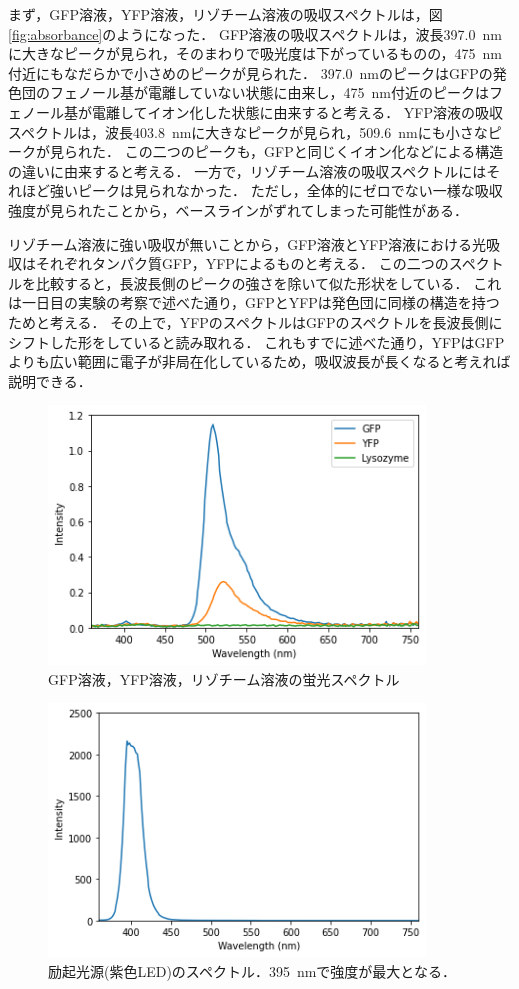 \documentclass[a4paper,11pt, titlepage]{jsarticle}
\begin{document}
まず，GFP溶液，YFP溶液，リゾチーム溶液の吸収スペクトルは，図\ref{fig:absorbance}のようになった．
GFP溶液の吸収スペクトルは，波長\SI{397.0}{\nm}に大きなピークが見られ，そのまわりで吸光度は下がっているものの，\SI{475}{\nm}付近にもなだらかで小さめのピークが見られた．
\SI{397.0}{\nm}のピークはGFPの発色団のフェノール基が電離していない状態に由来し，\SI{475}{\nm}付近のピークはフェノール基が電離してイオン化した状態に由来すると考える．
YFP溶液の吸収スペクトルは，波長\SI{403.8}{\nm}に大きなピークが見られ，\SI{509.6}{\nm}にも小さなピークが見られた．
この二つのピークも，GFPと同じくイオン化などによる構造の違いに由来すると考える．
一方で，リゾチーム溶液の吸収スペクトルにはそれほど強いピークは見られなかった．
ただし，全体的にゼロでない一様な吸収強度が見られたことから，ベースラインがずれてしまった可能性がある．

リゾチーム溶液に強い吸収が無いことから，GFP溶液とYFP溶液における光吸収はそれぞれタンパク質GFP，YFPによるものと考える．
この二つのスペクトルを比較すると，長波長側のピークの強さを除いて似た形状をしている．
これは一日目の実験の考察で述べた通り，GFPとYFPは発色団に同様の構造を持つためと考える．
その上で，YFPのスペクトルはGFPのスペクトルを長波長側にシフトした形をしていると読み取れる．
これもすでに述べた通り，YFPはGFPよりも広い範囲に電子が非局在化しているため，吸収波長が長くなると考えれば説明できる．

\begin{figure}[htbp]
    \centering
    \includegraphics[width=10cm]{fluorescent.png}
    \caption{GFP溶液，YFP溶液，リゾチーム溶液の蛍光スペクトル}
    \label{fig:fluorescent}
\end{figure}

\begin{figure}[htbp]
    \centering
    \includegraphics[width=10cm]{excitation.png}
    \caption{励起光源(紫色LED)のスペクトル．\SI{395}{\nm}で強度が最大となる．}
    \label{fig:excitation}
\end{figure}
\end{document}
